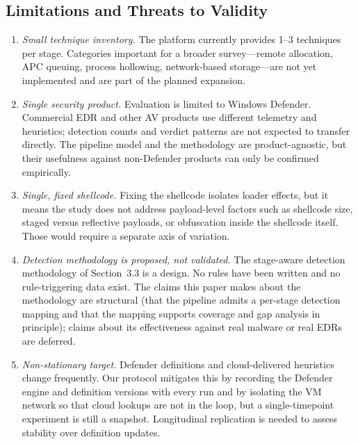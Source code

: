 \subsection{Limitations and Threats to Validity}

\begin{enumerate}[leftmargin=*, itemsep=2pt]
    \item \textit{Small technique inventory.}
    The platform currently provides 1--3 techniques per stage.
    Categories important for a broader survey---remote allocation, APC queuing, process hollowing, network-based storage---are not yet implemented and are part of the planned expansion.

    \item \textit{Single security product.}
    Evaluation is limited to Windows Defender.
    Commercial EDR and other AV products use different telemetry and heuristics; detection counts and verdict patterns are not expected to transfer directly.
    The pipeline model and the methodology are product-agnostic, but their usefulness against non-Defender products can only be confirmed empirically.

    \item \textit{Single, fixed shellcode.}
    Fixing the shellcode isolates loader effects, but it means the study does not address payload-level factors such as shellcode size, staged versus reflective payloads, or obfuscation inside the shellcode itself.
    Those would require a separate axis of variation.

    \item \textit{Detection methodology is proposed, not validated.}
    The stage-aware detection methodology of Section~3.3 is a design.
    No rules have been written and no rule-triggering data exist.
    The claims this paper makes about the methodology are structural (that the pipeline admits a per-stage detection mapping and that the mapping supports coverage and gap analysis in principle); claims about its effectiveness against real malware or real EDRs are deferred.

    \item \textit{Non-stationary target.}
    Defender definitions and cloud-delivered heuristics change frequently.
    Our protocol mitigates this by recording the Defender engine and definition versions with every run and by isolating the VM network so that cloud lookups are not in the loop, but a single-timepoint experiment is still a snapshot.
    Longitudinal replication is needed to assess stability over definition updates.


\end{enumerate}
